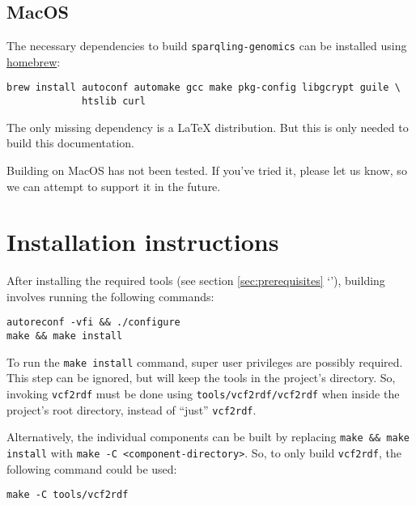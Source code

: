 \subsection{MacOS}

  The necessary dependencies to build \texttt{sparqling-genomics} can be
  installed using \href{https://brew.sh/}{homebrew}:

\begin{siderules}
\begin{verbatim}
brew install autoconf automake gcc make pkg-config libgcrypt guile \
             htslib curl
\end{verbatim}
\end{siderules}

  The only missing dependency is a \LaTeX{} distribution.  But this is
  only needed to build this documentation.

  Building on MacOS has not been tested.  If you've tried it, please let
  us know, so we can attempt to support it in the future.

\section{Installation instructions}

  After installing the required tools (see section \ref{sec:prerequisites}
  {\color{LinkGray}`\nameref{sec:vcf2rdf}'}),
  building involves running the following commands:

  \begin{siderules}
\begin{verbatim}
autoreconf -vfi && ./configure
make && make install
\end{verbatim}
\end{siderules}

  To run the \texttt{make install} command, super user privileges are possibly
  required.  This step can be ignored, but will keep the tools in the project's
  directory.  So, invoking \texttt{vcf2rdf} must be done using
  \texttt{tools/vcf2rdf/vcf2rdf} when inside the project's root directory,
  instead of ``just'' \texttt{vcf2rdf}.

Alternatively, the individual components can be built by replacing
\texttt{make \&\& make install} with \texttt{make -C <component-directory>}.
So, to only build \texttt{vcf2rdf}, the following command could be used:
\begin{siderules}
\begin{verbatim}
make -C tools/vcf2rdf
\end{verbatim}
\end{siderules}
